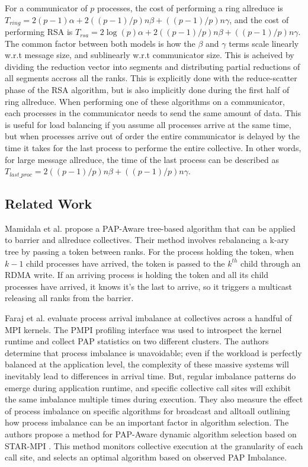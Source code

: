 For a communicator of $p$ processes, the cost of performing a ring allreduce is $T_{ring} = 2(p-1)\alpha + 2((p-1)/p)n\beta + ((p-1)/p)n\gamma$, and the cost of performing RSA is $T_{rsa} = 2\log(p)\alpha + 2((p-1)/p)n\beta + ((p-1)/p)n\gamma$.
The common factor between both models is how the $\beta$ and $\gamma$ terms scale linearly w.r.t message size, and sublinearly w.r.t communicator size.
This is acheived by dividing the reduction vector into segments and distributing partial reductions of all segments accross all the ranks.
This is explicitly done with the reduce-scatter phase of the RSA algorithm, but is also implicitly done during the first half of ring allreduce.
When performing one of these algorithms on a communicator, each processes in the communicator needs to send the same amount of data.
This is useful for load balancing if you assume all processes arrive at the same time, but when processes arrive out of order the entire communicator is delayed by the time it takes for the last process to performe the entire collective.
In other words, for large message allreduce, the time of the last process can be described as $T_{last\_proc}=2((p-1)/p)n\beta + ((p-1)/p)n\gamma$.

\subsection{Related Work}
Mamidala et al. \cite{Mamidala2004BarrierAllreduceIBAdaptive} propose a PAP-Aware tree-based algorithm that can be applied to barrier and allreduce collectives.
Their method involves rebalancing a k-ary tree by passing a token between ranks.
For the process holding the token, when $k-1$ child processes have arrived, the token is passed to the $k^{th}$ child through an RDMA write.
If an arriving process is holding the token and all its child processes have arrived, it knows it's the last to arrive, so it triggers a multicast releasing all ranks from the barrier. 

Faraj et al. \cite{Faraj2008StudyProcArrivalMPIColl} evaluate process arrival imbalance at collectives across a handful of MPI kernels.
The PMPI profiling interface was used to introspect the kernel runtime and collect PAP statistics on two different clusters.
The authors determine that process imbalance is unavoidable; even if the workload is perfectly balanced at the application level, the complexity of these massive systems will inevitably lead to differences in arrival time. 
But, regular imbalance patterns do emerge during application runtime, and specific collective call sites will exhibit the same imbalance multiple times during execution.
They also measure the effect of process imbalance on specific algorithms for broadcast and alltoall outlining how process imbalance can be an important factor in algorithm selection.
The authors propose a method for PAP-Aware dynamic algorithm selection based on STAR-MPI \cite{Faraj2006StarMPI}.
This method monitors collective execution at the granularity of each call site, and selects an optimal algorithm based on observed PAP Imbalance. 

